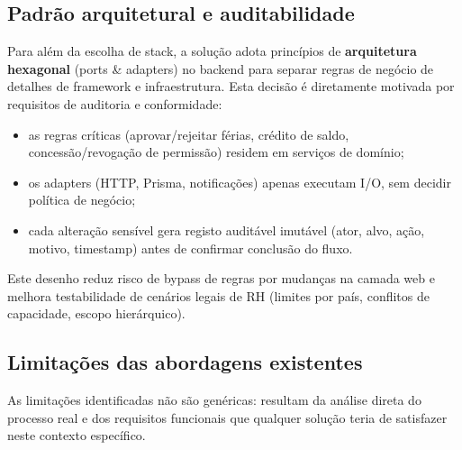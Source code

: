 \documentclass[11pt,a4paper,twoside]{article}
\begin{document}
\subsection{Padrão arquitetural e auditabilidade}

Para além da escolha de stack, a solução adota princípios de \textbf{arquitetura hexagonal} (ports \& adapters) no backend para separar regras de negócio de detalhes de framework e infraestrutura. Esta decisão é diretamente motivada por requisitos de auditoria e conformidade:

\begin{itemize}
  \item as regras críticas (aprovar/rejeitar férias, crédito de saldo, concessão/revogação de permissão) residem em serviços de domínio;
  \item os adapters (HTTP, Prisma, notificações) apenas executam I/O, sem decidir política de negócio;
  \item cada alteração sensível gera registo auditável imutável (ator, alvo, ação, motivo, timestamp) antes de confirmar conclusão do fluxo.
\end{itemize}

Este desenho reduz risco de bypass de regras por mudanças na camada web e melhora testabilidade de cenários legais de RH (limites por país, conflitos de capacidade, escopo hierárquico).

\subsection{Limitações das abordagens existentes}

As limitações identificadas não são genéricas: resultam da análise direta do processo real e dos requisitos funcionais que qualquer solução teria de satisfazer neste contexto específico.
\end{document}
